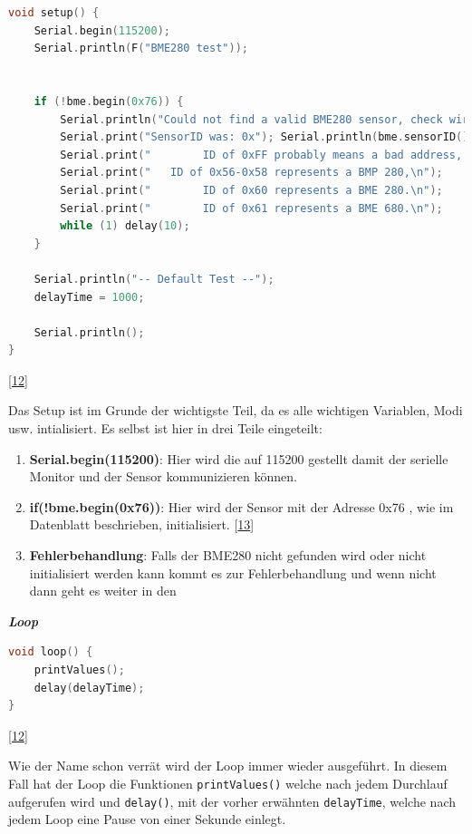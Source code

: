 \documentclass[
    headings=optiontotocandhead,%
    twoside,
    numbers=noenddot,%
    12pt, %
    titlepage, %
    parskip=full, %
    listof=leveldown, 
    numbers=noenddot, %
    a4paper,DIV=14,
    BCOR=15mm,
]{scrbook}
\newcommand{\passthrough}[1]{#1}
\providecommand{\tightlist}{%
  \setlength{\itemsep}{0pt}\setlength{\parskip}{0pt}}
\begin{document}
\begin{lstlisting}[language={C++}, caption={Setup BME}]
void setup() {
    Serial.begin(115200);
    Serial.println(F("BME280 test"));

    
    if (!bme.begin(0x76)) {
        Serial.println("Could not find a valid BME280 sensor, check wiring, address, sensor ID!");
        Serial.print("SensorID was: 0x"); Serial.println(bme.sensorID(),16);
        Serial.print("        ID of 0xFF probably means a bad address, a BMP 180 or BMP 085\n");
        Serial.print("   ID of 0x56-0x58 represents a BMP 280,\n");
        Serial.print("        ID of 0x60 represents a BME 280.\n");
        Serial.print("        ID of 0x61 represents a BME 680.\n");
        while (1) delay(10);
    }
    
    Serial.println("-- Default Test --");
    delayTime = 1000;

    Serial.println();
}
\end{lstlisting}

{[}\protect\hyperlink{ref-BME280-Test}{12}{]}

Das Setup ist im Grunde der wichtigste Teil, da es alle wichtigen
Variablen, Modi usw. intialisiert. Es selbst ist hier in drei Teile
eingeteilt:

\begin{enumerate}
\def\labelenumi{\arabic{enumi}.}
\tightlist
\item
  \textbf{Serial.begin(115200)}: Hier wird die auf 115200 gestellt damit
  der serielle Monitor und der Sensor kommunizieren können.
\item
  \textbf{if(!bme.begin(0x76))}: Hier wird der Sensor mit der Adresse
  0x76 , wie im Datenblatt beschrieben, initialisiert.
  {[}\protect\hyperlink{ref-BME280-Datasheet}{13}{]}
\item
  \textbf{Fehlerbehandlung}: Falls der BME280 nicht gefunden wird oder
  nicht initialisiert werden kann kommt es zur Fehlerbehandlung und wenn
  nicht dann geht es weiter in den
\end{enumerate}

\textbf{\emph{Loop}}

\begin{lstlisting}[language={C++}, caption={Loop Funktion des BME Programms}]
void loop() { 
    printValues();
    delay(delayTime);
}
\end{lstlisting}

{[}\protect\hyperlink{ref-BME280-Test}{12}{]}

Wie der Name schon verrät wird der Loop immer wieder ausgeführt. In
diesem Fall hat der Loop die Funktionen
\passthrough{\lstinline!printValues()!} welche nach jedem Durchlauf
aufgerufen wird und \passthrough{\lstinline!delay()!}, mit der vorher
erwähnten \passthrough{\lstinline!delayTime!}, welche nach jedem Loop
eine Pause von einer Sekunde einlegt.
\end{document}
